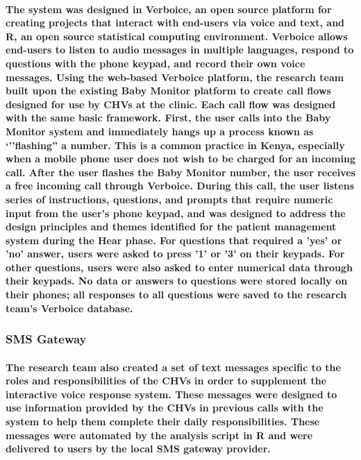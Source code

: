 \paragraph{The system was designed in Verboice, an open source platform for creating projects that interact with end-users via voice and text, and R, an open source statistical computing environment. Verboice allows end-users to listen to audio messages in multiple languages, respond to questions with the phone keypad, and  record their own voice messages. Using the web-based Verboice platform, the research team built upon the existing Baby Monitor platform to create call flows designed for use by CHVs at the clinic. Each call flow was designed with the same basic framework. First, the user calls into the Baby Monitor system and immediately hangs up \textemdash  a process known as `''flashing'' a number. This is a common practice in Kenya, especially when a mobile phone user does not wish to be charged for an incoming call. After the user flashes the Baby Monitor number, the user receives a free incoming call through Verboice. During this call, the user listens series of instructions, questions, and prompts that require numeric input from the user's phone keypad, and was designed to address the design principles and themes identified for the patient management system during the Hear phase. For questions that required a 'yes' or 'no' answer, users were asked to press '1' or '3' on their keypads. For other questions, users were also asked to enter numerical data through their keypads. No data or answers to questions were stored locally on their phones; all responses to all questions were saved to the research team's Verboice database.}

\subsubsection{SMS Gateway}
\paragraph{The research team also created a set of text messages specific to the roles and responsibilities of the CHVs in order to supplement the interactive voice response system. These messages were designed to use information provided by the CHVs in previous calls with the system to help them complete their daily responsibilities. These messages were automated by the analysis script in R and were delivered to users by the local SMS gateway provider.}

